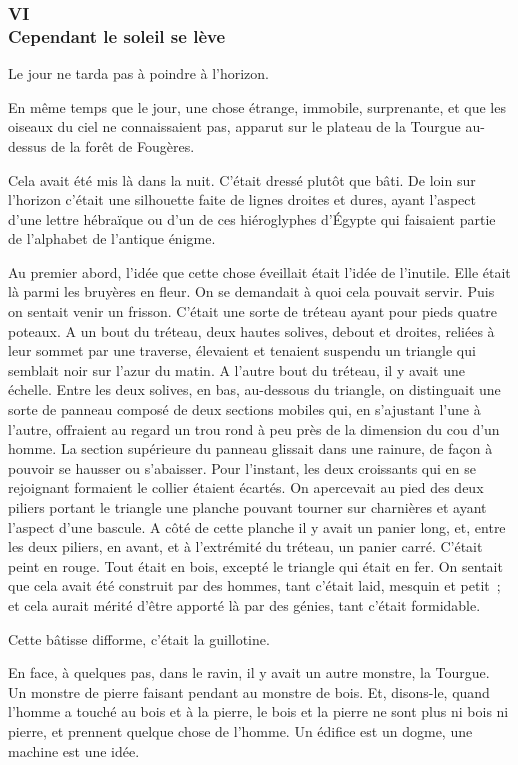 \documentclass[french,twoside]{book} %
\begin{document}
 \subsubsection[{VI. Cependant le soleil se lève}]{VI \\
Cependant le soleil se lève}
\label{p3l7c6}
\noindent Le jour ne tarda pas à poindre à l’horizon.\par
En même temps que le jour, une chose étrange, immobile, surprenante, et que les oiseaux du ciel ne connaissaient pas, apparut sur le plateau de la Tourgue au-dessus de la forêt de Fougères.\par
Cela avait été mis là dans la nuit. C’était dressé plutôt que bâti. De loin sur l’horizon c’était une silhouette faite de lignes droites et dures, ayant l’aspect d’une lettre hébraïque ou d’un de ces hiéroglyphes d’Égypte qui faisaient partie de l’alphabet de l’antique énigme.\par
Au premier abord, l’idée que cette chose éveillait était l’idée de l’inutile. Elle était là parmi les bruyères en fleur. On se demandait à quoi cela pouvait servir. Puis on sentait venir un frisson. C’était une sorte de tréteau ayant pour pieds quatre poteaux. A un bout du tréteau, deux hautes solives, debout et droites, reliées à leur sommet par une traverse, élevaient et tenaient suspendu un triangle qui semblait noir sur l’azur du matin. A l’autre bout du tréteau, il  y avait une échelle. Entre les deux solives, en bas, au-dessous du triangle, on distinguait une sorte de panneau composé de deux sections mobiles qui, en s’ajustant l’une à l’autre, offraient au regard un trou rond à peu près de la dimension du cou d’un homme. La section supérieure du panneau glissait dans une rainure, de façon à pouvoir se hausser ou s’abaisser. Pour l’instant, les deux croissants qui en se rejoignant formaient le collier étaient écartés. On apercevait au pied des deux piliers portant le triangle une planche pouvant tourner sur charnières et ayant l’aspect d’une bascule. A côté de cette planche il y avait un panier long, et, entre les deux piliers, en avant, et à l’extrémité du tréteau, un panier carré. C’était peint en rouge. Tout était en bois, excepté le triangle qui était en fer. On sentait que cela avait été construit par des hommes, tant c’était laid, mesquin et petit ; et cela aurait mérité d’être apporté là par des génies, tant c’était formidable.\par
Cette bâtisse difforme, c’était la guillotine.\par
En face, à quelques pas, dans le ravin, il y avait un autre monstre, la Tourgue. Un monstre de pierre faisant pendant au monstre de bois. Et, disons-le, quand l’homme a touché au bois et à la pierre, le bois et la pierre ne sont plus ni bois ni pierre, et prennent quelque chose de l’homme. Un édifice est un dogme, une machine est une idée.\par
\end{document}
